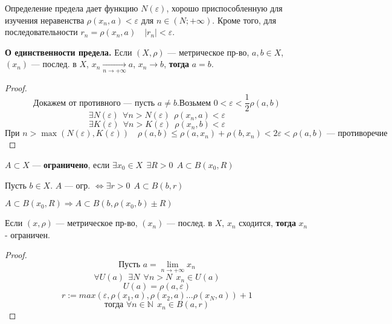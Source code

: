 

\usepackage{bm}




Определение предела дает функцию $N(\varepsilon)$, хорошо приспособленную
для изучения неравенства $\rho(x_n,a)<\varepsilon$ для $n\in(N;+\infty)$.
Кроме того, для последовательности $r_n=\rho(x_n, a) \quad |r_n|<\varepsilon$.

\begin{theorem}
\textbf{О единственности предела.}
Если $(X,\rho)$ --- метрическое пр-во, $a,b\in X$, $(x_n)$ --- послед. в $X$,
$x_n\xrightarrow[n\to +\infty]{} a$, $x_n\to b$,
\textbf{тогда} $a=b$.
\end{theorem}

\begin{proof}
$$\text{Докажем от противного --- пусть }a\not =b. \text{Возьмем } 0<\varepsilon<\frac{1}{2}\rho(a,b)$$
$$\exists N(\varepsilon) \ \ \forall n>N(\varepsilon) \ \ \rho(x_n,a)<\varepsilon$$
$$\exists K(\varepsilon) \ \ \forall n>K(\varepsilon) \ \ \rho(x_n,b)<\varepsilon$$
$$\text{При } n>\max(N(\varepsilon),K(\varepsilon)) \quad \rho(a,b)\leq
\rho(a,x_n)+\rho(b,x_n)<2\varepsilon<\rho(a,b) \text{ --- противоречие}$$
\end{proof}

\begin{definition}
$A\subset X$ --- {\bf ограничено}, если $\exists x_0\in X \ \ \exists R>0 \ \ A\subset B(x_0, R)$
\end{definition}

Пусть $b\in X$. $A$ --- огр. $\Leftrightarrow \exists r>0 \ \ A\subset B(b,r)$

$A\subset B(x_0, R)\Rightarrow A\subset B(b,\rho(x_0,b)\pm R)$

\begin{theorem}
Если $(x,\rho)$ --- метрическое пр-во, $(x_n)$ --- послед. в $X$, $x_n$ сходится, \textbf{тогда} $x_n$ - ограничен.
\end{theorem}

\begin{proof}
$$\text{Пусть } a=\lim\limits_{n\to +\infty} x_n$$
$$\forall U(a) \ \ \exists N \ \ \forall n>N \ \ x_n\in U(a)$$
$$U(a)=\rho(a,\varepsilon) $$
$$r:=max(\varepsilon, \rho(x_1, a), \rho(x_2, a) \ldots \rho(x_N, a))+1 $$
$$\text{тогда } \forall n\in\mathbb{N} \ \ x_n\in B(a,r)$$
\end{proof}

